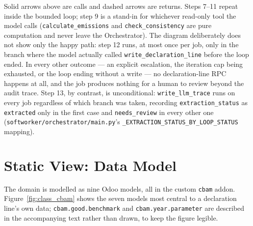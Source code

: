 \FloatBarrier

Solid arrows above are calls and dashed arrows are returns. Steps 7--11
repeat inside the bounded loop; step 9 is a stand-in for whichever
read-only tool the model calls (\texttt{calculate\_emissions} and
\texttt{check\_consistency} are pure computation and never leave the
Orchestrator). The diagram deliberately does not show only the happy
path: step 12 runs, at most once per job, only in the branch where the
model actually called \texttt{write\_declaration\_line} before the loop
ended. In every other outcome --- an explicit escalation, the iteration
cap being exhausted, or the loop ending without a write --- no
declaration-line RPC happens at all, and the job produces nothing for a
human to review beyond the audit trace. Step 13, by contrast, is
unconditional: \texttt{write\_llm\_trace} runs on every job regardless of
which branch was taken, recording \texttt{extraction\_status} as
\texttt{extracted} only in the first case and \texttt{needs\_review} in
every other one (\texttt{softworker/orchestrator/main.py}'s
\texttt{\_EXTRACTION\_STATUS\_BY\_LOOP\_STATUS} mapping).

\section{Static View: Data Model}
\label{sec:data_model_cbam}

The domain is modelled as nine Odoo models, all in the custom \texttt{cbam}
addon. Figure~\ref{fig:class_cbam} shows the seven models most central to a
declaration line's own data; \texttt{cbam.good.benchmark} and
\texttt{cbam.year.parameter} are described in the accompanying text rather
than drawn, to keep the figure legible.

